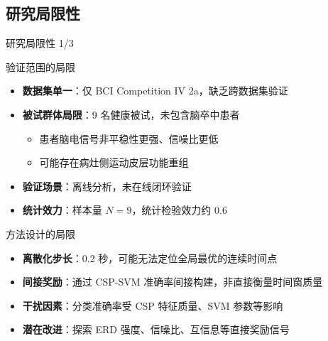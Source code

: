 {\subsection{研究局限性}

\begin{frame}{研究局限性 1/3}
    \begin{block}{验证范围的局限}
        \begin{itemize}
            \item \textbf{数据集单一}：仅 BCI Competition IV 2a，缺乏跨数据集验证
            \item \textbf{被试群体局限}：9 名健康被试，未包含脑卒中患者
            \begin{itemize}
                \item 患者脑电信号非平稳性更强、信噪比更低
                \item 可能存在病灶侧运动皮层功能重组
            \end{itemize}
            \item \textbf{验证场景}：离线分析，未在线闭环验证
            \item \textbf{统计效力}：样本量 $N=9$，统计检验效力约 0.6
        \end{itemize}
    \end{block}

    \vspace{0.3cm}
    \begin{block}{方法设计的局限}
        \begin{itemize}
            \item \textbf{离散化步长}：0.2 秒，可能无法定位全局最优的连续时间点
            \item \textbf{间接奖励}：通过 CSP-SVM 准确率间接构建，非直接衡量时间窗质量
            \item \textbf{干扰因素}：分类准确率受 CSP 特征质量、SVM 参数等影响
            \item \textbf{潜在改进}：探索 ERD 强度、信噪比、互信息等直接奖励信号
        \end{itemize}
    \end{block}
\end{frame}

}
